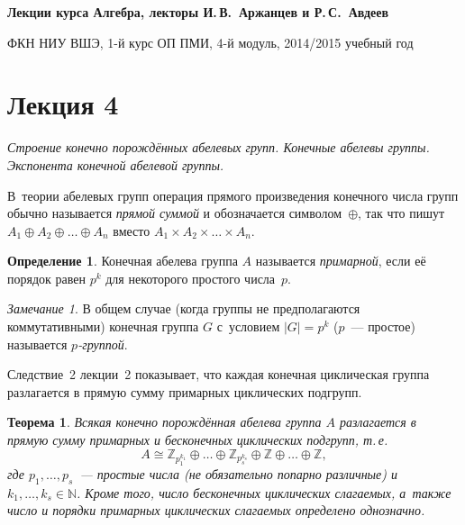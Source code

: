 \documentclass[a4paper,10pt]{amsart}
\def\ZZ{{\mathbb Z}}%
\def\NN{{\mathbb N}}%
\newtheorem{theorem}{Теорема}
\theoremstyle{definition}
\newtheorem{definition}{Определение}
\theoremstyle{remark}
\newtheorem{remark}{Замечание}
\begin{document}
%
\sloppy
%
\centerline{\large \bf Лекции курса \guillemotleft
Алгебра\guillemotright{}, лекторы И.\,В.~Аржанцев и Р.\,С.~Авдеев}

\smallskip

\centerline{\large ФКН НИУ ВШЭ, 1-й курс ОП ПМИ, 4-й модуль,
2014/2015 учебный год}


\bigskip

\section*{Лекция 4}

\medskip

{\it Строение конечно порождённых абелевых групп. Конечные абелевы
группы. Экспонента конечной абелевой группы.}

В~теории абелевых групп операция прямого произведения конечного
числа групп обычно называется \textit{прямой суммой} и обозначается
символом~$\oplus$, так что пишут $A_1 \oplus A_2 \oplus \ldots
\oplus A_n$ вместо $A_1 \times A_2 \times \ldots \times A_n$.

\begin{definition}
Конечная абелева группа $A$ называется {\it примарной}, если её
порядок равен $p^k$ для некоторого простого числа~$p$.
\end{definition}

\begin{remark}
В общем случае (когда группы не предполагаются коммутативными)
конечная группа $G$ с~условием $|G| = p^k$ ($p$~--- простое)
называется {\it $p$-группой}.
\end{remark}

Следствие~2 лекции~2 показывает, что каждая конечная циклическая
группа разлагается в прямую сумму примарных циклических подгрупп.

\begin{theorem} \label{traz}
Всякая конечно порождённая абелева группа $A$ разлагается в прямую
сумму примарных и бесконечных циклических подгрупп, т.\,е.
\begin{equation} \label{eqn}
A \cong \ZZ_{p_1^{k_1}} \oplus \ldots \oplus \ZZ_{p_s^{k_s}} \oplus
\ZZ \oplus \ldots \oplus \ZZ,
\end{equation}
где $p_1, \ldots, p_s$~--- простые числа \textup(не обязательно
попарно различные\textup) и $k_1, \ldots, k_s \in \NN$. Кроме того,
число бесконечных циклических слагаемых, а~также число и порядки
примарных циклических слагаемых определено однозначно.
\end{theorem}
\end{document}
